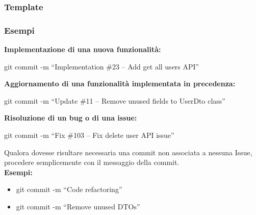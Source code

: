 \subsubsection{Template}

\begin{large}
\end{large}

\subsubsection{Esempi}
\textbf{Implementazione di una nuova funzionalità:}
\begin{center}
    git commit -m “Implementation \#23 – Add get all users API”
\end{center}
\medskip \medskip
\textbf{Aggiornamento di una funzionalità implementata in precedenza: }
\begin{center}
    git commit -m “Update \#11 – Remove unused fields to UserDto class”
\end{center}
\medskip \medskip
\textbf{Risoluzione di un bug o di una issue: }
\begin{center}
    git commit -m “Fix  \#103 – Fix delete user API issue”
\end{center}
\medskip \medskip
Qualora dovesse risultare necessaria una commit non associata a nessuna Issue, procedere semplicemente con il messaggio della commit.\\
\textbf{Esempi: }
\begin{center}
    \begin{itemize}
        \item git commit -m “Code refactoring” 
        \item git commit -m “Remove unused DTOs”
    \end{itemize}
\end{center}
